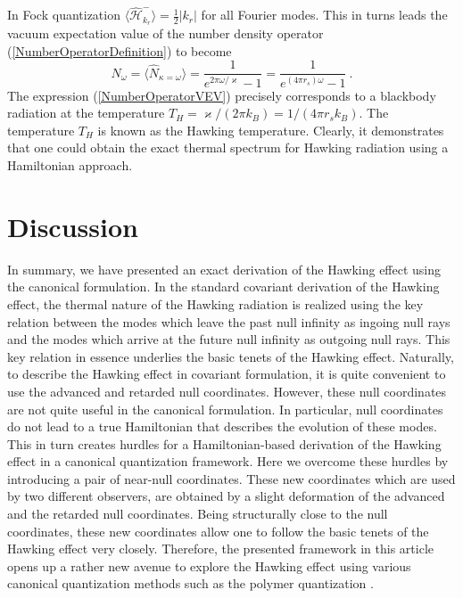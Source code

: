 \documentclass[aps,twocolumn,showpacs]{revtex4}
\def\kr{\kappa}
\def\ksg{\mathrm{\varkappa}}
\def\rs{r_s}
\begin{document}
In Fock quantization $\langle\hat{\mathcal{H}}_{k_r}^{-}\rangle = 
\frac{1}{2}|k_r|$ for all Fourier modes. This in turns leads the vacuum 
expectation value of the number density operator 
(\ref{NumberOperatorDefinition}) to become
%
\begin{equation}\label{NumberOperatorVEV}
N_{\omega} = \langle \hat{N}_{\kr=\omega}\rangle 
= \frac{1}{e^{2\pi\omega/\ksg} - 1} 
= \frac{1}{e^{(4\pi\rs)\omega} - 1} ~.
\end{equation}
% 
The expression (\ref{NumberOperatorVEV}) precisely corresponds to a blackbody 
radiation at the temperature $T_H = \ksg/(2\pi k_B) = 1/(4\pi\rs k_B)$. The 
temperature $T_H$ is known as the Hawking temperature. Clearly, it demonstrates 
that one could obtain the exact thermal spectrum for Hawking radiation using a 
Hamiltonian approach.



\section{Discussion}\label{discussion}


In summary, we have presented an exact derivation of the Hawking effect using 
the canonical formulation. In the standard covariant derivation of the Hawking 
effect, the thermal nature of the Hawking radiation is realized using the key 
relation between the modes which leave the past null infinity as ingoing null 
rays and the modes which arrive at the future null infinity as outgoing null 
rays. This key relation in essence underlies the basic tenets of the Hawking 
effect. Naturally, to describe the Hawking effect in covariant formulation, it 
is quite convenient to  use the advanced and retarded null coordinates. However, 
these null coordinates are not quite useful in the canonical formulation. In 
particular, null coordinates do not lead to a true Hamiltonian that describes 
the evolution of these modes. This in turn creates hurdles for a 
Hamiltonian-based derivation of the Hawking effect in a canonical 
quantization framework. Here we overcome these hurdles by introducing a pair of 
near-null coordinates. These new coordinates which are used by two different 
observers, are obtained by a slight deformation of the advanced and the retarded 
null coordinates.  Being structurally close to the null coordinates, these new 
coordinates allow one to follow the basic tenets of the Hawking effect very 
closely. Therefore, the presented framework in this article opens up a rather 
new avenue to explore the Hawking effect using various canonical quantization 
methods such as the polymer quantization \cite{Barman:2017a2}.
\end{document}
